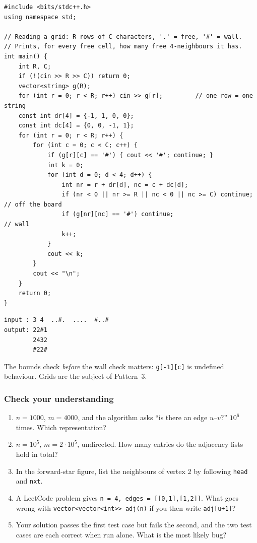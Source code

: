 \begin{lstlisting}[style=cpp]
#include <bits/stdc++.h>
using namespace std;

// Reading a grid: R rows of C characters, '.' = free, '#' = wall.
// Prints, for every free cell, how many free 4-neighbours it has.
int main() {
    int R, C;
    if (!(cin >> R >> C)) return 0;
    vector<string> g(R);
    for (int r = 0; r < R; r++) cin >> g[r];         // one row = one string
    const int dr[4] = {-1, 1, 0, 0};
    const int dc[4] = {0, 0, -1, 1};
    for (int r = 0; r < R; r++) {
        for (int c = 0; c < C; c++) {
            if (g[r][c] == '#') { cout << '#'; continue; }
            int k = 0;
            for (int d = 0; d < 4; d++) {
                int nr = r + dr[d], nc = c + dc[d];
                if (nr < 0 || nr >= R || nc < 0 || nc >= C) continue;  // off the board
                if (g[nr][nc] == '#') continue;                        // wall
                k++;
            }
            cout << k;
        }
        cout << "\n";
    }
    return 0;
}
\end{lstlisting}

\begin{lstlisting}[style=trace]
input : 3 4  ..#.  ....  #..#
output: 22#1
        2432
        #22#
\end{lstlisting}

The bounds check \emph{before} the wall check matters: \texttt{g[-1][c]} is undefined behaviour. Grids are the subject of Pattern~3.

\subsubsection*{Check your understanding}

\begin{enumerate}[leftmargin=*]
    \item $n=1000$, $m=4000$, and the algorithm asks ``is there an edge $u$--$v$?'' $10^6$ times. Which representation?
    \item $n=10^5$, $m=2\cdot10^5$, undirected. How many entries do the adjacency lists hold in total?
    \item In the forward-star figure, list the neighbours of vertex 2 by following \texttt{head} and \texttt{nxt}.
    \item A LeetCode problem gives \texttt{n = 4, edges = [[0,1],[1,2]]}. What goes wrong with \texttt{vector<vector<int>> adj(n)} if you then write \texttt{adj[u+1]}?
    \item Your solution passes the first test case but fails the second, and the two test cases are each correct when run alone. What is the most likely bug?
\end{enumerate}

